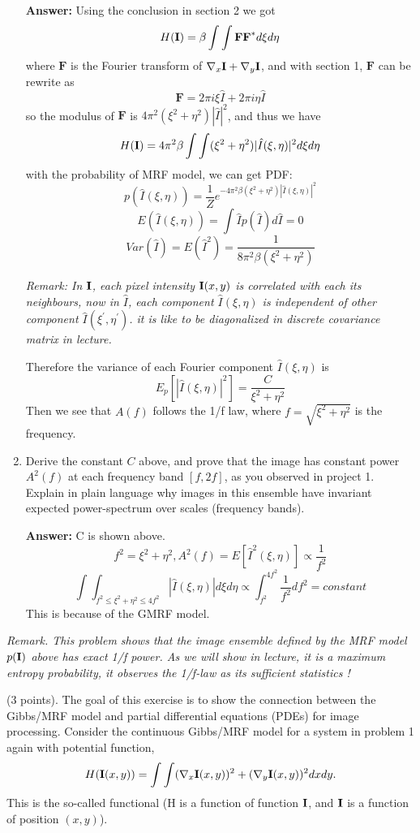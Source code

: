 \documentclass[11pt]{article}
\newcommand{\I}{{\bf I}}
\begin{document}
\begin{enumerate}
\textbf{Answer:}
Using the conclusion in section 2 we got
$$
\begin{aligned}
	H(\I) = \beta \int\int \textbf{F}\textbf{F}^*d\xi d\eta
\end{aligned}
$$
where $\textbf{F}$ is the Fourier transform of $\nabla_x \I + \nabla_y \I$, and with section 1, $\textbf{F}$ can be rewrite as
$$
\textbf{F} = 2\pi i\xi \hat{I} + 2\pi i\eta \hat{I}
$$
so the modulus of $\textbf{F}$ is $4\pi^2(\xi^2 + \eta^2)|\hat{I}|^2$, and thus we have
$$
H(\I) = 4\pi^2\beta \int\int (\xi^2+\eta^2)|\hat{I}(\xi,\eta)|^2d\xi d\eta
$$
with the probability of MRF model, we can get PDF:
$$
p(\hat{I}(\xi,\eta))=\frac{1}{Z}e^{-4\pi^2\beta(\xi^2+\eta^2)|\hat{I}(\xi,\eta)|^2}
$$
$$
E(\hat{I}(\xi,\eta))=\int \hat{I}p(\hat{I})d\hat{I} = 0
$$
$$
Var(\hat{I})=E(\hat{I}^2)=\frac{1}{8\pi^2\beta(\xi^2+\eta^2)}
$$
{\em Remark: In $\I$, each pixel intensity $\I(x,y)$ is correlated with
each its neighbours, now in $\hat{I}$, each component $\hat{I}(\xi,\eta)$ is
independent of other component $\hat{I}(\xi^\prime,\eta^\prime)$. it is like to be diagonalized in discrete covariance matrix in lecture.

Therefore the variance of each Fourier component $\hat{I}(\xi,\eta)$ is
\[
  E_p[|\hat{I}(\xi,\eta)|^2] = \frac{C}{\xi^2 + \eta^2}
\]
Then  we see that $A(f)$ follows the 1/f law, where $f=\sqrt{\xi^2 +\eta^2}$ is the frequency. 
}

\item  Derive the constant $C$ above, and prove that the image has constant power $A^2(f)$ at each frequency band $[f, 2f]$, as you observed in project 1.
Explain in plain language why images in this ensemble have invariant expected power-spectrum over scales
(frequency bands).

\textbf{Answer:}
C is shown above.
$$
f^2 =\xi^2+\eta^2, A^2(f) = E[\hat{I}^2(\xi,\eta)]\propto\frac{1}{f^2} 
$$
$$
\int\int_{f^2\leq\xi^2+\eta^2\leq4f^2}|\hat{I}(\xi,\eta)|d\xi d\eta\propto\int_{f^2}^{4f^2}\frac{1}{f^2}df^2=constant
$$
This is because of the GMRF model.

\end{enumerate}
{\em Remark. This problem shows that the image ensemble defined by the MRF model $p(\I)$ above has exact 1/f power.   As we will show in lecture, it is a maximum entropy probability, it observes the 1/f-law as its sufficient statistics !}

\vspace{0.5cm}


 (3  points). The goal of this exercise is to show the connection between the Gibbs/MRF model and partial differential equations (PDEs) for image processing.   Consider the continuous Gibbs/MRF model for a system in problem 1 again with potential function,
\[
    H(\I(x,y)) = \int\int (\nabla_x \I(x,y))^2 + (\nabla_y \I(x,y))^2 dxdy.
\]
This is the so-called functional (H is a function of function $\I$, and $\I$ is a function of position $(x,y)$). 
\end{document}
